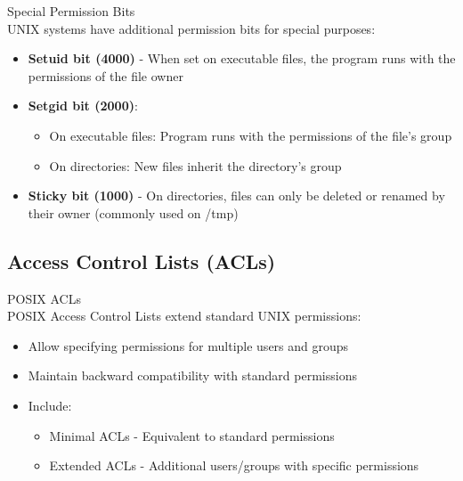 \begin{concept}{Special Permission Bits}\\
UNIX systems have additional permission bits for special purposes:
\begin{itemize}
    \item \textbf{Setuid bit (4000)} - When set on executable files, the program runs with the permissions of the file owner
    \item \textbf{Setgid bit (2000)}:
    \begin{itemize}
        \item On executable files: Program runs with the permissions of the file's group
        \item On directories: New files inherit the directory's group
    \end{itemize}
    \item \textbf{Sticky bit (1000)} - On directories, files can only be deleted or renamed by their owner (commonly used on /tmp)
\end{itemize}
\end{concept}


\subsection{Access Control Lists (ACLs)}

\begin{definition}{POSIX ACLs}\\
POSIX Access Control Lists extend standard UNIX permissions:
\begin{itemize}
    \item Allow specifying permissions for multiple users and groups
    \item Maintain backward compatibility with standard permissions
    \item Include:
    \begin{itemize}
        \item Minimal ACLs - Equivalent to standard permissions
        \item Extended ACLs - Additional users/groups with specific permissions
    \end{itemize}
\end{itemize}
\end{definition}

